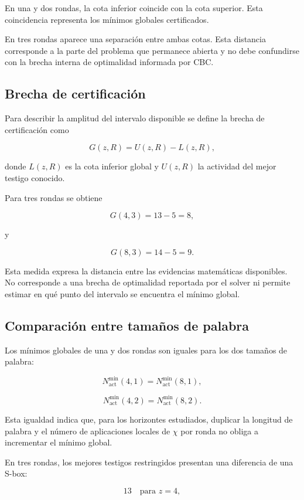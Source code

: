En una y dos rondas, la cota inferior coincide con la cota superior. Esta
coincidencia representa los mínimos globales certificados.

En tres rondas aparece una separación entre ambas cotas. Esta distancia
corresponde a la parte del problema que permanece abierta y no debe
confundirse con la brecha interna de optimalidad informada por CBC.


\subsection{Brecha de certificación}
\label{subsec:brecha_certificacion}

Para describir la amplitud del intervalo disponible se define la brecha de
certificación como

\[
G(z,R)
=
U(z,R)-L(z,R),
\]

donde $L(z,R)$ es la cota inferior global y $U(z,R)$ la actividad del mejor
testigo conocido.

Para tres rondas se obtiene

\[
G(4,3)
=
13-5
=
8,
\]

y

\[
G(8,3)
=
14-5
=
9.
\]

Esta medida expresa la distancia entre las evidencias matemáticas
disponibles. No corresponde a una brecha de optimalidad reportada por el
solver ni permite estimar en qué punto del intervalo se encuentra el
mínimo global.


\subsection{Comparación entre tamaños de palabra}
\label{subsec:comparacion_tamanos}

Los mínimos globales de una y dos rondas son iguales para los dos tamaños
de palabra:

\[
N_{\mathrm{act}}^{\min}(4,1)
=
N_{\mathrm{act}}^{\min}(8,1),
\]

\[
N_{\mathrm{act}}^{\min}(4,2)
=
N_{\mathrm{act}}^{\min}(8,2).
\]

Esta igualdad indica que, para los horizontes estudiados, duplicar la
longitud de palabra y el número de aplicaciones locales de $\chi$ por
ronda no obliga a incrementar el mínimo global.

En tres rondas, los mejores testigos restringidos presentan una diferencia
de una S-box:

\[
13
\quad \text{para } z=4,
\]

